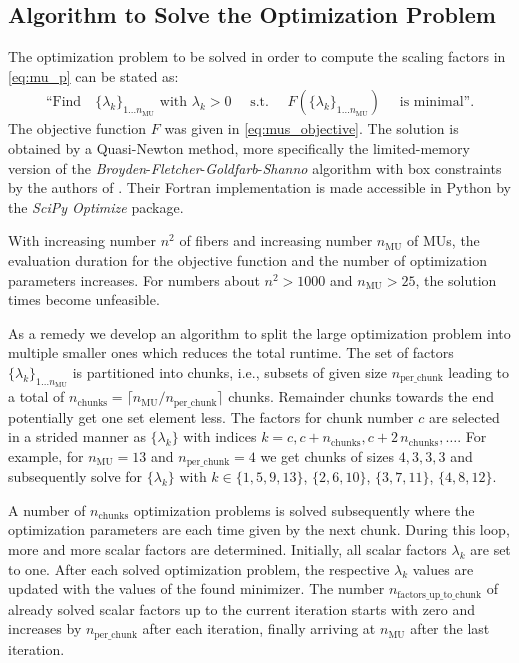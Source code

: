 \subsection{Algorithm to Solve the Optimization Problem}
The optimization problem to be solved in order to compute the scaling factors in \cref{eq:mu_p} can be stated as:
\begin{align}\label{eq:mus_opt}
  \text{``Find}\quad \{\lambda_k\}_{1\dots n_\text{MU}} \text{ with } \lambda_k > 0 \quad \text{ s.t. } \quad F(\{\lambda_k\}_{1\dots n_\text{MU}}) \quad \text{ is minimal''.}
\end{align}
The objective function $F$ was given in \cref{eq:mus_objective}. The solution is obtained by a Quasi-Newton method, more specifically the limited-memory version of the \emph{Broyden}-\emph{Fletcher}-\emph{Goldfarb}-\emph{Shanno} algorithm with box constraints by the authors of \cite{byrd1995limited}. Their Fortran implementation is made accessible in Python by the \emph{SciPy Optimize} package.

With increasing number $n^2$ of fibers and increasing number $n_\text{MU}$ of MUs, the evaluation duration for the objective function and the number of optimization parameters increases. For numbers about $n^2 > 1000$ and $n_\text{MU} > 25$, the solution times become unfeasible.

As a remedy we develop an algorithm to split the large optimization problem into multiple smaller ones which reduces the total runtime. 
The set of factors $\{\lambda_k\}_{1\dots n_\text{MU}}$ is partitioned into chunks, i.e., subsets of given size $n_\text{per\_chunk}$ leading to a total of $n_\text{chunks} = \lceil n_\text{MU} / n_\text{per\_chunk} \rceil$ chunks.
Remainder chunks towards the end potentially get one set element less. 
The factors for chunk number $c$ are selected in a strided manner as $\{\lambda_k\}$ with indices ${k=c, c+n_\text{chunks}, c+2\,n_\text{chunks}, \dots}$. For example, for $n_\text{MU}=13$ and $n_\text{per\_chunk}=4$ we get chunks of sizes $4,3,3,3$ and subsequently solve for $\{\lambda_k\}$ with $k \in \{1,5,9,13\}$, $\{2,6,10\}$, $\{3,7,11\}$, $\{4,8,12\}$.

A number of $n_\text{chunks}$ optimization problems is solved subsequently where the optimization parameters are each time given by the next chunk. During this loop, more and more scalar factors are determined.
Initially, all scalar factors $\lambda_k$ are set to one. 
After each solved optimization problem, the respective $\lambda_k$ values are updated with the values of the found minimizer.
The number $n_\text{factors\_up\_to\_chunk}$ of already solved scalar factors up to the current iteration starts with zero and increases by $n_\text{per\_chunk}$ after each iteration, finally arriving at $n_\text{MU}$ after the last iteration.

